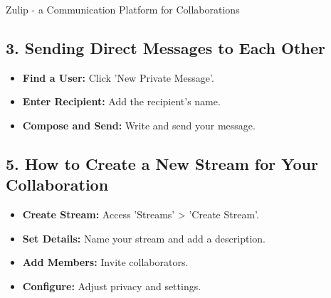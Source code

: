 \begin{coverpage}{Zulip - a Communication Platform for Collaborations}
{\subsection*{3. Sending Direct Messages to Each Other}
\begin{itemize}[leftmargin=0.5cm, rightmargin=0.5cm]
\item \textbf{Find a User:} Click 'New Private Message'.
\item \textbf{Enter Recipient:} Add the recipient's name.
\item \textbf{Compose and Send:} Write and send your message.
\end{itemize}
\subsection*{5. How to Create a New Stream for Your Collaboration}
\begin{itemize}[leftmargin=0.5cm, rightmargin=0.5cm]
\item \textbf{Create Stream:} Access 'Streams' > 'Create Stream'.
\item \textbf{Set Details:} Name your stream and add a description.
\item \textbf{Add Members:} Invite collaborators.
\item \textbf{Configure:} Adjust privacy and settings.
\end{itemize}
}
\end{coverpage}
